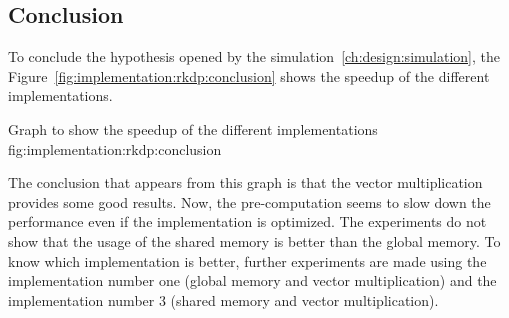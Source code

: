\subsection{Conclusion}
\label{ch:implementation:rkdp:conclusion}

To conclude the hypothesis opened by the simulation~\ref{ch:design:simulation},
the Figure~\ref{fig:implementation:rkdp:conclusion} shows the speedup of the
different implementations.

{Graph to show the speedup of the different implementations}
{fig:implementation:rkdp:conclusion}

The conclusion that appears from this graph is that the vector multiplication
provides some good results.
Now, the pre-computation seems to slow down the performance even if the
implementation is optimized.
The experiments do not show that the usage of the shared memory is better than
the global memory.
To know which implementation is better, further experiments are made using the
implementation number one (global memory and vector multiplication) and the
implementation number 3 (shared memory and vector multiplication).

